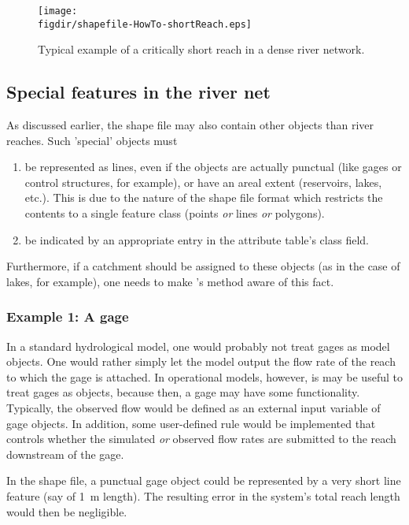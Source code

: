 \begin{figure}
  \centering
  \texttt{[image: \\figdir/shapefile-HowTo-shortReach.eps]}
  \caption{Typical example of a critically short reach in a dense river network. \label{fig:shapefile-HowTo-shortReach}}
\end{figure}

\subsection{Special features in the river net} \label{sec:topocatch:hints-specialFeatures}

As discussed earlier, the shape file may also contain other objects than river reaches. Such 'special' objects must
\begin{enumerate}
  \item be represented as lines, even if the objects are actually punctual (like gages or control structures, for example), or have an areal extent (reservoirs, lakes, etc.). This is due to the nature of the shape file format which restricts the contents to a single feature class (points \emph{or} lines \emph{or} polygons).
  \item be indicated by an appropriate entry in the attribute table's class field.
\end{enumerate}

Furthermore, if a catchment should be assigned to these objects (as in the case of lakes, for example), one needs to make 's  method aware of this fact.

\subsubsection*{Example 1: A gage}
In a standard hydrological model, one would probably not treat gages as model objects. One would rather simply let the model output the flow rate of the reach to which the gage is attached. In operational models, however, is may be useful to treat gages as objects, because then, a gage may have some functionality. Typically, the observed flow would be defined as an external input variable of gage objects. In addition, some user-defined rule would be implemented that controls whether the simulated \emph{or} observed flow rates are submitted to the reach downstream of the gage.

In the shape file, a punctual gage object could be represented by a very short line feature (say of 1~m length). The resulting error in the system's total reach length would then be negligible.


